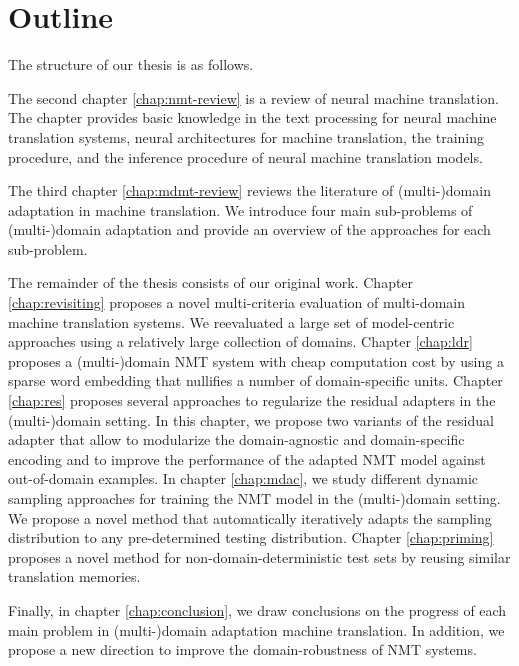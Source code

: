 \section{Outline}
The structure of our thesis is as follows.

The second chapter \ref{chap:nmt-review} is a review of neural machine translation. The chapter provides basic knowledge in the text processing for neural machine translation systems, neural architectures for machine translation, the training procedure, and the inference procedure of neural machine translation models.

The third chapter \ref{chap:mdmt-review} reviews the literature of (multi-)domain adaptation in machine translation. We introduce four main sub-problems of (multi-)domain adaptation and provide an overview of the approaches for each sub-problem.

The remainder of the thesis consists of our original work. Chapter \ref{chap:revisiting} proposes a novel multi-criteria evaluation of multi-domain machine translation systems. We reevaluated a large set of model-centric approaches using a relatively large collection of domains. Chapter \ref{chap:ldr} proposes a (multi-)domain NMT system with cheap computation cost by using a sparse word embedding that nullifies a number of domain-specific units. Chapter \ref{chap:res} proposes several approaches to regularize the residual adapters \citep{Bapna19simple} in the (multi-)domain setting. In this chapter, we propose two variants of the residual adapter that allow to modularize the domain-agnostic and domain-specific encoding and to improve the performance of the adapted NMT model against out-of-domain examples. In chapter \ref{chap:mdac}, we study different dynamic sampling approaches for training the NMT model in the (multi-)domain setting. We propose a novel method that automatically iteratively adapts the sampling distribution to any pre-determined testing distribution. Chapter \ref{chap:priming} proposes a novel method for non-domain-deterministic test sets by reusing similar translation memories.

Finally, in chapter \ref{chap:conclusion}, we draw conclusions on the progress of each main problem in (multi-)domain adaptation machine translation. In addition, we propose a new direction to improve the domain-robustness of NMT systems.


























